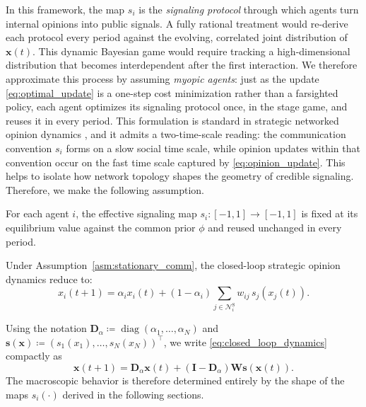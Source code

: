 \documentclass[journal,twoside,web]{ieeecolor}
\begin{document}
In this framework, the map $s_i$ is the \emph{signaling protocol} through which agents turn internal opinions into public signals. A fully rational treatment would re-derive each protocol every period against the evolving, correlated joint distribution of $\bm{x}(t)$. This dynamic Bayesian game would require tracking a high-dimensional distribution that becomes interdependent after the first interaction. We therefore approximate this process by assuming \emph{myopic agents}:  just as the update \eqref{eq:optimal_update} is a one-step cost minimization rather than a farsighted policy, each agent optimizes its signaling protocol once,  in the stage game, and reuses it in every period. This formulation is standard in strategic networked opinion dynamics \cite{etesami2019influence, forster2016trust}, and it admits a two-time-scale reading: the communication convention $s_i$ forms on a slow social time scale, while opinion updates within that convention occur on the fast time scale captured by \eqref{eq:opinion_update}. This helps to isolate how network topology shapes the geometry of credible signaling. Therefore, we make the following assumption.

\begin{standassumption}
    \label{asm:stationary_comm}
    For each agent $i$, the effective signaling map $s_i:[-1,1]\to[-1,1]$ is fixed at its equilibrium value against the common prior $\phi$ and reused unchanged in every period.
\end{standassumption}

Under Assumption~\ref{asm:stationary_comm}, the closed-loop strategic opinion dynamics reduce to:
\begin{equation}
    \label{eq:closed_loop_dynamics}
    x_i(t+1)
    =
    \alpha_i x_i(t)
    +
    (1-\alpha_i)\sum_{j\in\mathcal{N}_i^{\mathrm{S}}} w_{ij}\,s_j(x_j(t)).
\end{equation}

Using the notation $\bm{D}_{\alpha}\coloneqq \operatorname{diag}(\alpha_1,\dots,\alpha_N)$ and $\bm{s}(\bm{x})\coloneqq (s_1(x_1),\dots,s_N(x_N))^\top$, we write \eqref{eq:closed_loop_dynamics} compactly as
\begin{equation}
    \label{eq:vector_closed_loop}
    \bm{x}(t+1)
    =
    \bm{D}_{\alpha}\bm{x}(t)
    +
    (\bm{I}-\bm{D}_{\alpha})\bm{W}\bm{s}(\bm{x}(t)).
\end{equation}
The macroscopic behavior is therefore determined entirely by the shape of the maps $s_i(\cdot)$ derived in the following sections.
\end{document}
